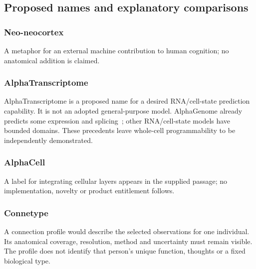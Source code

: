 \subsection*{Proposed names and explanatory comparisons}


\subsubsection*{Neo-neocortex}

\noindent A metaphor for an external machine contribution to human cognition; no anatomical addition is claimed.\par


\subsubsection*{AlphaTranscriptome}

\noindent AlphaTranscriptome is a proposed name for a desired RNA/cell-state prediction capability. It is not an adopted general-purpose model. AlphaGenome already predicts some expression and splicing~\citep{alphagenomeRetained}; other RNA/cell-state models have bounded domains. These precedents leave whole-cell programmability to be independently demonstrated.\par


\subsubsection*{AlphaCell}

\noindent A label for integrating cellular layers appears in the supplied passage; no implementation, novelty or product entitlement follows.\par


\subsubsection*{Connetype}

\noindent A connection profile would describe the selected observations for one individual. Its anatomical coverage, resolution, method and uncertainty must remain visible. The profile does not identify that person’s unique function, thoughts or a fixed biological type.\par


